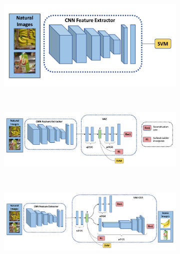 \begin{figure}[t]
    \centering
    \begin{subfigure}[b]{0.35\textwidth}
    	\centering
    	\includegraphics[width=\textwidth]{PaperA/figures/cnn.pdf}
    	\caption{}
    	\label{subfig:cnn}
    \end{subfigure} ~
    \begin{subfigure}[b]{0.6\textwidth}
		\centering
		\includegraphics[width=\textwidth]{PaperA/figures/cnn+vae.pdf}
		\caption{}
		\label{subfig:cnn+vae}
	\end{subfigure} \\
    \begin{subfigure}[b]{0.7\textwidth}
		\centering
		\includegraphics[width=\textwidth]{PaperA/figures/vae-cca.pdf}
		\caption{}
		\label{subfig:vae-cca}
	\end{subfigure}

\end{figure}
